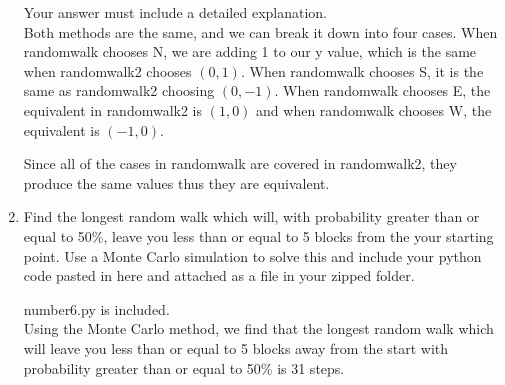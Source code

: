 \documentclass[10pt,letterpaper]{article}
\begin{document}
\begin{enumerate}
Your answer must include a detailed explanation.
\\
Both methods are the same, and we can break it down into four cases.
When randomwalk chooses N, we are adding 1 to our y value, which is the same when 
randomwalk2 chooses $(0, 1)$. When randomwalk chooses S, it is the same as 
randomwalk2 choosing $(0, -1)$. When randomwalk chooses E, the equivalent in 
randomwalk2 is $(1, 0)$ and when randomwalk chooses W, the equivalent is $(-1, 0)$. 

Since all of the cases in randomwalk are covered in randomwalk2, they produce the 
same values thus they are equivalent.  
 \item Find the longest random walk which will, with probability greater than or equal to 50\%, leave you less than or equal to 5 blocks from the your starting point.
Use a Monte Carlo simulation to solve this and include your python code pasted in here and attached as a file in your zipped folder.

number6.py is included. \\
Using the Monte Carlo method, we find that the longest random walk which will leave 
you less than or equal to 5 blocks away from the start with probability greater than 
or equal to 50\% is 31 steps. 


\end{enumerate}
\end{document}
